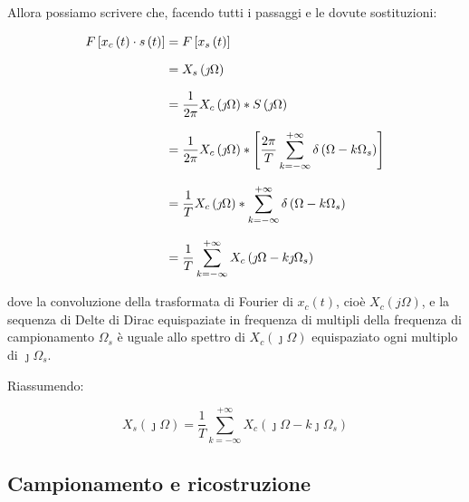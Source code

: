 \newpage 

Allora possiamo scrivere che, facendo tutti i passaggi e le dovute sostituzioni: 

{
    \Large 
    \begin{equation}
        \setlength{\jot}{10pt} %
        \begin{split}
        F \left[ x_c \left(t\right) \cdot s \left(t\right)\right] 
        &= 
        F \left[ x_s \left( t\right)\right] 
        \\
        &= 
        X_s \left(\jmath \Omega\right) 
        \\
        &= 
        \dfrac{1}{2 \pi} 
        X_c \left(\jmath \Omega \right) * S \left(\jmath \Omega \right) 
        \\
        &=
        \dfrac{1}{2 \pi} 
        X_c \left(\jmath \Omega \right) 
        * 
        \left[
        \dfrac{2 \pi}{T}
        \sum_{k = -\infty}^{+ \infty} 
        \delta\left(\Omega - k \Omega_s\right)
        \right]
        \\
        &= 
        \dfrac{1}{T}
        X_c \left(\jmath \Omega \right) 
        *
        \sum_{k = -\infty}^{+ \infty} 
        \delta\left(\Omega - k \Omega_s\right) 
        \\
        &= 
        \dfrac{1}{T}
        \sum_{k = -\infty}^{+ \infty} 
        X_c \left(\jmath \Omega - k \jmath \Omega_s\right) 
        \end{split}
    \end{equation}
} 

dove la convoluzione della trasformata di Fourier di $x_c \left( t\right)$, cioè $X_c \left(j \Omega\right)$, 
e la sequenza di Delte di Dirac equispaziate in frequenza di multipli della frequenza di campionamento $\Omega_s$ 
è uguale allo spettro di $X_c (\jmath \Omega)$ equispaziato ogni multiplo di $\jmath \Omega_s$. \newline 

Riassumendo: 

{
    \Large 
    \begin{equation}
    X_s \left(\jmath \Omega\right)  
    =    
    \dfrac{1}{T}
    \sum_{k = -\infty}^{+ \infty} 
    X_c \left(\jmath \Omega - k \jmath \Omega_s\right)
    \end{equation}
}

\newpage 

\subsection{Campionamento e ricostruzione}

